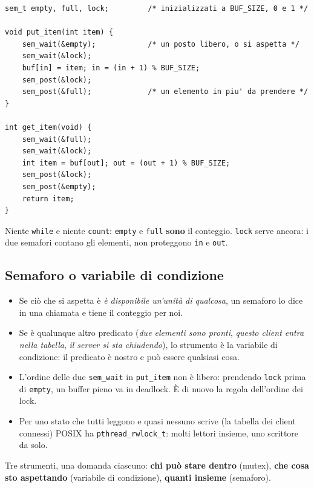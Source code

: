 \begin{lstlisting}[language={[POSIX]C}, style=wnumbers, title={Lo stesso buffer con i semafori}]
sem_t empty, full, lock;         /* inizializzati a BUF_SIZE, 0 e 1 */

void put_item(int item) {
    sem_wait(&empty);            /* un posto libero, o si aspetta */
    sem_wait(&lock);
    buf[in] = item; in = (in + 1) % BUF_SIZE;
    sem_post(&lock);
    sem_post(&full);             /* un elemento in piu' da prendere */
}

int get_item(void) {
    sem_wait(&full);
    sem_wait(&lock);
    int item = buf[out]; out = (out + 1) % BUF_SIZE;
    sem_post(&lock);
    sem_post(&empty);
    return item;
}
\end{lstlisting}

Niente \texttt{while} e niente \texttt{count}: \texttt{empty} e \texttt{full} \textbf{sono} il conteggio. \texttt{lock}
serve ancora: i due semafori contano gli elementi, non proteggono \texttt{in} e \texttt{out}.

\subsection{Semaforo o variabile di condizione}

\begin{itemize}
    \item Se ciò che si aspetta è \emph{è disponibile un'unità di qualcosa}, un semaforo lo dice in una chiamata e tiene il
          conteggio per noi.
    \item Se è qualunque altro predicato (\emph{due elementi sono pronti}, \emph{questo client entra nella tabella},
          \emph{il server si sta chiudendo}), lo strumento è la variabile di condizione: il predicato è nostro e può essere
          qualsiasi cosa.
    \item L'ordine delle due \texttt{sem\_wait} in \texttt{put\_item} non è libero: prendendo \texttt{lock} prima di
          \texttt{empty}, un buffer pieno va in deadlock. È di nuovo la regola dell'ordine dei lock.
    \item Per uno stato che tutti leggono e quasi nessuno scrive (la tabella dei client connessi) POSIX ha
          \texttt{pthread\_rwlock\_t}: molti lettori insieme, uno scrittore da solo.
\end{itemize}
Tre strumenti, una domanda ciascuno: \textbf{chi può stare dentro} (mutex), \textbf{che cosa sto aspettando} (variabile di
condizione), \textbf{quanti insieme} (semaforo).

